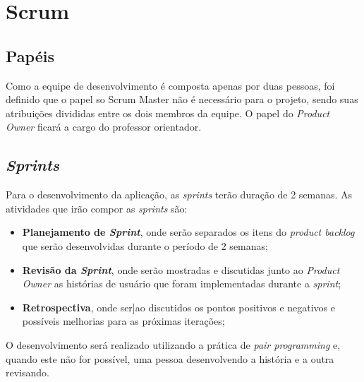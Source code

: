 \section{Scrum}

\subsection{Papéis}
Como a equipe de desenvolvimento é composta apenas por duas pessoas, foi definido que o papel so Scrum Master não é necessário para o projeto, sendo suas atribuições divididas entre os dois membros da equipe. O papel do \textit{Product Owner} ficará a cargo do professor orientador.

\subsection{\textit{Sprints}}
Para o desenvolvimento da aplicação, as \textit{sprints} terão duração de 2 semanas. As atividades que irão compor as \textit{sprints} são: 
\begin{itemize}
  \item \textbf{Planejamento de \textit{Sprint}}, onde serão separados os itens do \textit{product backlog} que serão desenvolvidas durante o período de 2 semanas;
  \item \textbf{Revisão da \textit{Sprint}}, onde serão mostradas e discutidas junto ao \textit{Product Owner} as histórias de usuário que foram implementadas durante a \textit{sprint};
  \item \textbf{Retrospectiva}, onde ser]ao discutidos os pontos positivos e negativos e possíveis melhorias para as próximas iterações;
\end{itemize}
O desenvolvimento será realizado utilizando a prática de \textit{pair programming} e, quando este não for possível, uma pessoa desenvolvendo a história e a outra revisando.
